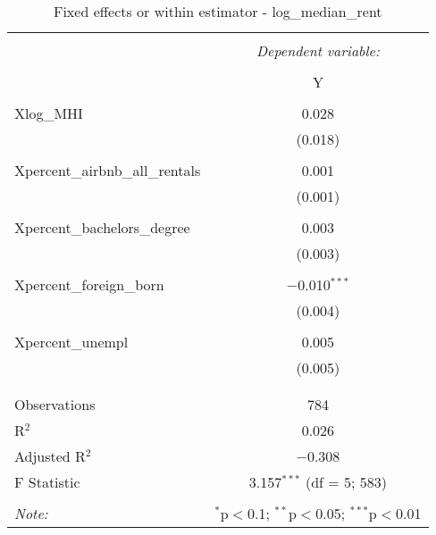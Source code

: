 \documentclass{article}
\begin{document}
\begin{table}[!htbp] \centering 
  \caption{Fixed effects or within estimator - log\_median\_rent} 
  \label{} 
  \begin{tabular}{@{\extracolsep{5pt}}lc} 
    \\[-1.8ex]\hline 
    \hline \\[-1.8ex] 
    & \multicolumn{1}{c}{\textit{Dependent variable:}} \\ 
    \cline{2-2} 
    \\[-1.8ex] & Y \\ 
    \hline \\[-1.8ex] 
    Xlog\_MHI & 0.028 \\ 
    & (0.018) \\ 
    & \\ 
    Xpercent\_airbnb\_all\_rentals & 0.001 \\ 
    & (0.001) \\ 
    & \\ 
    Xpercent\_bachelors\_degree & 0.003 \\ 
    & (0.003) \\ 
    & \\ 
    Xpercent\_foreign\_born & $-$0.010$^{***}$ \\ 
    & (0.004) \\ 
    & \\ 
    Xpercent\_unempl & 0.005 \\ 
    & (0.005) \\ 
    & \\ 
    \hline \\[-1.8ex] 
    Observations & 784 \\ 
    R$^{2}$ & 0.026 \\ 
    Adjusted R$^{2}$ & $-$0.308 \\ 
    F Statistic & 3.157$^{***}$ (df = 5; 583) \\ 
    \hline 
    \hline \\[-1.8ex] 
    \textit{Note:}  & \multicolumn{1}{r}{$^{*}$p$<$0.1; $^{**}$p$<$0.05; $^{***}$p$<$0.01} \\ 
  \end{tabular} 
\end{table} 
\end{document}
